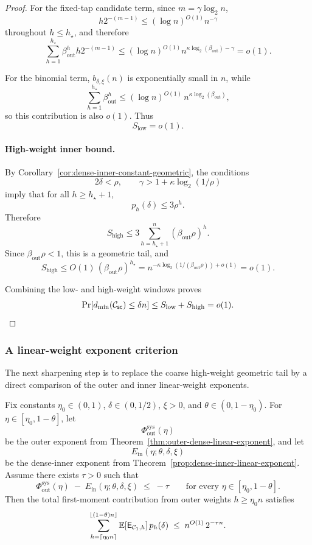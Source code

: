 \begin{proof}
For the fixed-tap candidate term, since \(m=\gamma\log_2 n\),
\[
h2^{-(m-1)}\le (\log n)^{O(1)}n^{-\gamma}
\]
throughout \(h\le h_\star\), and therefore
\[
\sum_{h=1}^{h_\star}\beta_{\mathrm{out}}^h h2^{-(m-1)}
\le
(\log n)^{O(1)}n^{\kappa\log_2(\beta_{\mathrm{out}})-\gamma}
=o(1).
\]

For the binomial term, \(b_{\delta,\xi}(n)\) is exponentially small in \(n\), while
\[
\sum_{h=1}^{h_\star} \beta_{\mathrm{out}}^h
\le
(\log n)^{O(1)}\,n^{\kappa\log_2(\beta_{\mathrm{out}})},
\]
so this contribution is also \(o(1)\).
Thus
\[
S_{\mathrm{low}}=o(1).
\]

\paragraph{High-weight inner bound.}
By Corollary~\ref{cor:dense-inner-constant-geometric}, the conditions
\[
2\delta<\rho,
\qquad
\gamma>1+\kappa\log_2(1/\rho)
\]
imply that for all \(h\ge h_\star+1\),
\[
p_h(\delta)\le 3\rho^h.
\]
Therefore
\[
S_{\mathrm{high}}
\le
3\sum_{h=h_\star+1}^{n}(\beta_{\mathrm{out}}\rho)^h.
\]
Since \(\beta_{\mathrm{out}}\rho<1\), this is a geometric tail, and
\[
S_{\mathrm{high}}
\le
O(1)\,(\beta_{\mathrm{out}}\rho)^{h_\star}
=
n^{-\kappa\log_2(1/(\beta_{\mathrm{out}}\rho))+o(1)}
=o(1).
\]

Combining the low- and high-weight windows proves
\[
\Pr[d_{\min}({\mathcal{C}_{\mathsf{sc}}})\le \delta n]
\le
S_{\mathrm{low}}+S_{\mathrm{high}}
=
o(1).
\]
\end{proof}
\subsubsection{A linear-weight exponent criterion}
\label{sec:integration-dense-dense-linear}

The next sharpening step is to replace the coarse high-weight geometric tail by a direct comparison of the outer and
inner linear-weight exponents.

\begin{theorem}
\label{thm:dense-dense-linear-weight-criterion}
Fix constants \(\eta_0\in(0,1)\), \(\delta\in(0,1/2)\), \(\xi>0\), and \(\theta\in(0,1-\eta_0)\).
For \(\eta\in[\eta_0,1-\theta]\), let
\[
\Phi_{\mathrm{out}}^{\mathrm{sys}}(\eta)
\]
be the outer exponent from Theorem~\ref{thm:outer-dense-linear-exponent}, and let
\[
E_{\mathrm{in}}(\eta;\theta,\delta,\xi)
\]
be the dense-inner exponent from Theorem~\ref{prop:dense-inner-linear-exponent}.
Assume there exists \(\tau>0\) such that
\begin{equation}
\label{eq:dense-dense-linear-gap}
\Phi_{\mathrm{out}}^{\mathrm{sys}}(\eta)
\;-\;
E_{\mathrm{in}}(\eta;\theta,\delta,\xi)
\;\le\;
-\tau
\qquad\text{for every }\eta\in[\eta_0,1-\theta].
\end{equation}
Then the total first-moment contribution from outer weights \(h\ge \eta_0 n\) satisfies
\[
\sum_{h=\lceil \eta_0 n\rceil}^{\lfloor (1-\theta)n\rfloor}
\mathbb{E}[\mathsf{E}_{{\mathcal{C}_1},h}]\,p_h(\delta)
\;\le\;
n^{O(1)}\,2^{-\tau n}.
\]
\end{theorem}


